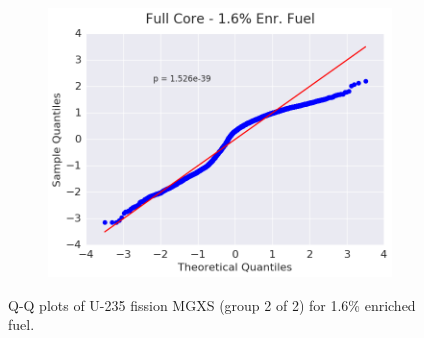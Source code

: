 \begin{figure}[h!]
\begin{subfigure}{0.5\textwidth}
  \centering
  \includegraphics[width=\linewidth]{figures/patterns/full-core/quantile/16-enr-fiss-2} \caption{}
  \label{fig:chap9-qq-full-core-1.6-fiss}
\end{subfigure}
\caption[Q-Q plots of U-235 fission MGXS for 1.6\% enriched fuel]{\ac{Q-Q} plots of U-235 fission \ac{MGXS} (group 2 of 2) for 1.6\% enriched fuel.}
\label{fig:chap9-qq-1.6-fiss}
\end{figure}

